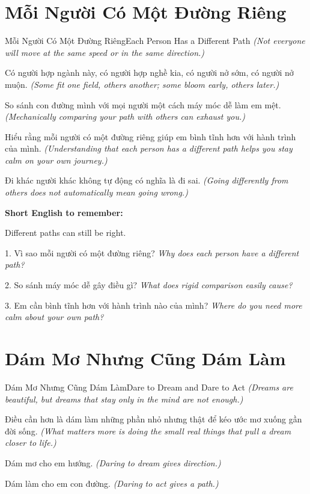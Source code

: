 \section{Mỗi Người Có Một Đường Riêng}
\begin{truyen}{Mỗi Người Có Một Đường Riêng}{Each Person Has a Different Path}
\textit{(Not everyone will move at the same speed or in the same direction.)}

Có người hợp ngành này, có người hợp nghề kia, có người nở sớm, có người nở muộn.
\textit{(Some fit one field, others another; some bloom early, others later.)}

So sánh con đường mình với mọi người một cách máy móc dễ làm em mệt.
\textit{(Mechanically comparing your path with others can exhaust you.)}

Hiểu rằng mỗi người có một đường riêng giúp em bình tĩnh hơn với hành trình của mình.
\textit{(Understanding that each person has a different path helps you stay calm on your own journey.)}
\end{truyen}

\begin{baihoc}
Đi khác người khác không tự động có nghĩa là đi sai.
\textit{(Going differently from others does not automatically mean going wrong.)}
\end{baihoc}

\begin{ghinhoanh}
\textbf{Short English to remember:}

Different paths can still be right.

\end{ghinhoanh}

\begin{tuhocnhanh}
1. Vì sao mỗi người có một đường riêng? \textit{Why does each person have a different path?}

2. So sánh máy móc dễ gây điều gì? \textit{What does rigid comparison easily cause?}

3. Em cần bình tĩnh hơn với hành trình nào của mình? \textit{Where do you need more calm about your own path?}
\end{tuhocnhanh}
\ngancach

\section{Dám Mơ Nhưng Cũng Dám Làm}
\begin{truyen}{Dám Mơ Nhưng Cũng Dám Làm}{Dare to Dream and Dare to Act}
\textit{(Dreams are beautiful, but dreams that stay only in the mind are not enough.)}

Điều cần hơn là dám làm những phần nhỏ nhưng thật để kéo ước mơ xuống gần đời sống.
\textit{(What matters more is doing the small real things that pull a dream closer to life.)}

Dám mơ cho em hướng.
\textit{(Daring to dream gives direction.)}

Dám làm cho em con đường.
\textit{(Daring to act gives a path.)}
\end{truyen}

